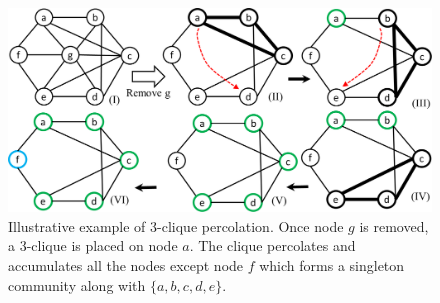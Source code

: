 


\begin{figure}[!t]
\centering
\includegraphics[width=\columnwidth]{./texfiles/Chapter_2/figures/percolation}
\caption{Illustrative example of 3-clique percolation. Once node $g$ is removed, a 3-clique is placed on node $a$. The clique  percolates and accumulates all the nodes except node $f$ which forms a singleton community along with $\{a,b,c,d,e\}$.}\label{fig_percolation} 
\end{figure}

